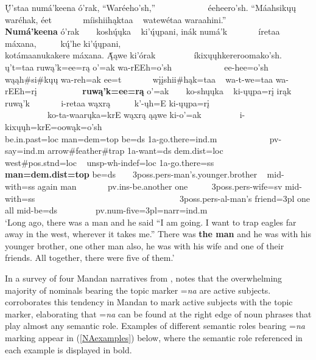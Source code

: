 \begin{exe}
\begin{xlist}
        \glll Ų́'staa numá'keena ó'rak, ``Waréeho'sh,'' ~ ~ ~ ~ ~ ~ ~ éeheero'sh.  ``Máahsikųų waréhak, éet ~ ~ ~ ~ míishiihąktaa ~ watewétaa waraahini.'' ~ ~ ~ ~ ~ ~ \textbf{Numá'keena} ó'rak ~ ~ koshų́ųka ~ ki'ų́ųpani, inák numá'k ~ ~ ~ ~ íretaa máxana, ~ ~ ~ kų́'he ki'ų́ųpani, ~ ~ ~ ~ ~ ~ ~ ~ ~ ~ ~ ~ ~ ~ ~ ~ ~ ~ ~ ~ kotámaanukakere máxana. Ą́ąwe ki'órak ~ ~ ~ ~ ~ íkixųųhkereroomako'sh.\\ 
        ų't=taa ruwą'k=ee=rą o'=ak wa-rEEh=o'sh ~ ~ ~ ~ ~ ~ ~ ee-hee=o'sh wąąh\#si\#kųų wa-reh=ak ee=t ~ ~ ~ ~ wįįshii\#hąk=taa ~ wa-t-we=taa wa-rEEh=rį ~ ~ ~ ~ ~ ~ \textbf{ruwą'k=ee=rą} o'=ak ~ ~ ko-shųųka ~ ki-ųųpa=rį irąk ruwą'k ~ ~ ~ ~ i-retaa wąxrą ~ ~ ~ k'-ųh=E ki-ųųpa=rį ~ ~ ~ ~ ~ ~ ~ ~ ~ ~ ~ ~ ~ ~ ~ ~ ~ ~ ~ ~ ko-ta-waarųka=krE wąxrą ąąwe ki-o'=ak ~ ~ ~ ~ ~ i-kixųųh=krE=oowąk=o'sh \\ 
    \textnormal{be.in.past}=loc \textnormal{man}=dem=top \textnormal{be}=ds 1a-\textnormal{go.there}=ind.m ~ ~ ~ ~ ~ ~ ~ pv-\textnormal{say}=ind.m \textnormal{arrow}\#\textnormal{feather}\#\textnormal{trap} 1a-\textnormal{want}=ds dem.dist=loc ~ ~ ~ ~ \textnormal{west}\#pos.stnd=loc ~ unsp-wh-indef=loc 1a-\textnormal{go.there}=ss ~ ~ ~ ~ ~ ~ \textnormal{\bfseries man}\textbf{=dem.dist=top} \textnormal{be}=ds ~ ~ 3poss.pers-\textnormal{man's.younger.brother} ~ mid-\textnormal{with}=ss \textnormal{again} \textnormal{man} ~ ~ ~ ~ pv.ins-\textnormal{be.another} \textnormal{one} ~ ~ ~ 3poss.pers-\textnormal{wife}=sv mid-\textnormal{with}=ss ~ ~ ~ ~ ~ ~ ~ ~ ~ ~ ~ ~ ~ ~ ~ ~ ~ ~ ~ ~ 3poss.pers-al-\textnormal{man's friend}=3pl \textnormal{one} \textnormal{all} mid-\textnormal{be}=ds ~ ~ ~ ~ ~ pv.num-\textnormal{five}=3pl=narr=ind.m\\
        \glt `Long ago, there was a man and he said ``I am going. I want to trap eagles far away in the west, wherever it takes me.'' There was \textbf{the man} and he was with his younger brother, one other man also, he was with his wife and one of their friends. All together, there were five of them.' \citep[237]{trechter2012b}
    \end{xlist}

\end{exe}

In a survey of four Mandan narratives from \citet{hollow1973a}, \citet[586]{wolvengray1991} notes that the overwhelming majority of nominals bearing the topic marker =\textit{na} are active subjects. \citet{kasak2022} corroborates this tendency in Mandan to mark active subjects with the topic marker, elaborating that =\textit{na} can be found at the right edge of noun phrases that play almost any semantic role. Examples of different semantic roles bearing =\textit{na} marking appear in (\ref{NAexamples}) below, where the semantic role referenced in each example is displayed in bold.

